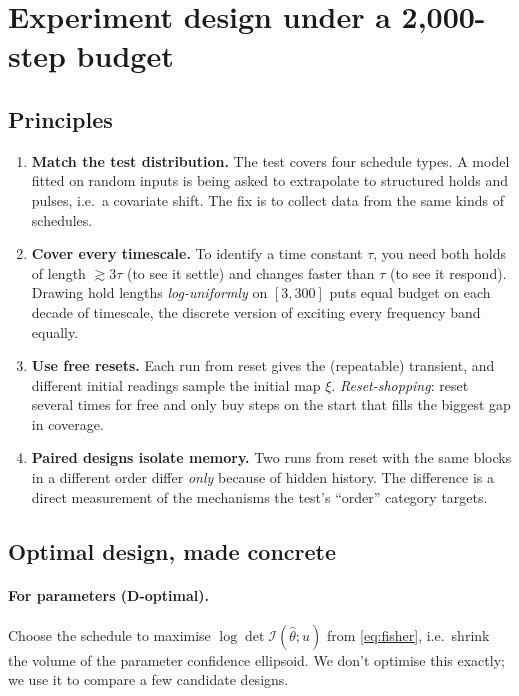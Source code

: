 \documentclass[11pt]{article}
\theoremstyle{plain}
\theoremstyle{definition}
\theoremstyle{remark}
\begin{document}
\section{Experiment design under a 2,000-step budget}\label{sec:design}

\subsection{Principles}
\begin{enumerate}
\item \textbf{Match the test distribution.} The test covers four schedule types. A model fitted on random inputs is being asked to extrapolate to structured holds and pulses, i.e.\ a covariate shift. The fix is to collect data from the same kinds of schedules.
\item \textbf{Cover every timescale.} To identify a time constant $\tau$, you need both holds of length $\gtrsim3\tau$ (to see it settle) and changes faster than $\tau$ (to see it respond). Drawing hold lengths \emph{log-uniformly} on $[3,300]$ puts equal budget on each decade of timescale, the discrete version of exciting every frequency band equally.
\item \textbf{Use free resets.} Each run from reset gives the (repeatable) transient, and different initial readings sample the initial map $\xi$. \emph{Reset-shopping}: reset several times for free and only buy steps on the start that fills the biggest gap in coverage.
\item \textbf{Paired designs isolate memory.} Two runs from reset with the same blocks in a different order differ \emph{only} because of hidden history. The difference is a direct measurement of the mechanisms the test's ``order'' category targets.
\end{enumerate}

\subsection{Optimal design, made concrete}
\paragraph{For parameters (D-optimal).} Choose the schedule to maximise $\log\det\mathcal I(\hat\theta;u)$ from \eqref{eq:fisher}, i.e.\ shrink the volume of the parameter confidence ellipsoid. We don't optimise this exactly; we use it to compare a few candidate designs.
\end{document}
